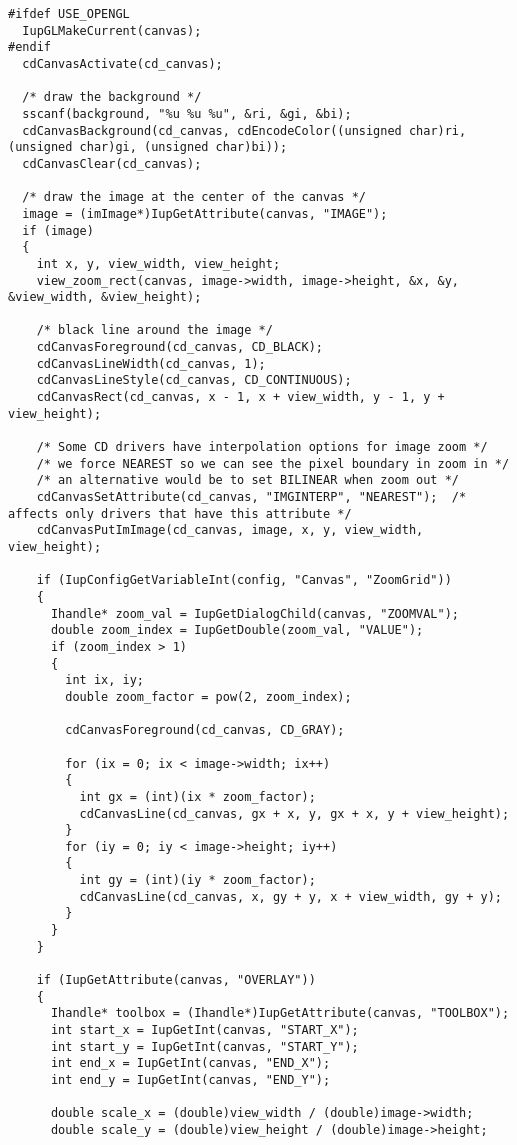 \documentclass{ctexart}
\begin{document}
\begin{lstlisting}
#ifdef USE_OPENGL
  IupGLMakeCurrent(canvas);
#endif
  cdCanvasActivate(cd_canvas);

  /* draw the background */
  sscanf(background, "%u %u %u", &ri, &gi, &bi);
  cdCanvasBackground(cd_canvas, cdEncodeColor((unsigned char)ri, (unsigned char)gi, (unsigned char)bi));
  cdCanvasClear(cd_canvas);

  /* draw the image at the center of the canvas */
  image = (imImage*)IupGetAttribute(canvas, "IMAGE");
  if (image)
  {
    int x, y, view_width, view_height;
    view_zoom_rect(canvas, image->width, image->height, &x, &y, &view_width, &view_height);

    /* black line around the image */
    cdCanvasForeground(cd_canvas, CD_BLACK);
    cdCanvasLineWidth(cd_canvas, 1);
    cdCanvasLineStyle(cd_canvas, CD_CONTINUOUS);
    cdCanvasRect(cd_canvas, x - 1, x + view_width, y - 1, y + view_height);

    /* Some CD drivers have interpolation options for image zoom */
    /* we force NEAREST so we can see the pixel boundary in zoom in */
    /* an alternative would be to set BILINEAR when zoom out */
    cdCanvasSetAttribute(cd_canvas, "IMGINTERP", "NEAREST");  /* affects only drivers that have this attribute */
    cdCanvasPutImImage(cd_canvas, image, x, y, view_width, view_height);

    if (IupConfigGetVariableInt(config, "Canvas", "ZoomGrid"))
    {
      Ihandle* zoom_val = IupGetDialogChild(canvas, "ZOOMVAL");
      double zoom_index = IupGetDouble(zoom_val, "VALUE");
      if (zoom_index > 1)
      {
        int ix, iy;
        double zoom_factor = pow(2, zoom_index);

        cdCanvasForeground(cd_canvas, CD_GRAY);

        for (ix = 0; ix < image->width; ix++)
        {
          int gx = (int)(ix * zoom_factor);
          cdCanvasLine(cd_canvas, gx + x, y, gx + x, y + view_height);
        }
        for (iy = 0; iy < image->height; iy++)
        {
          int gy = (int)(iy * zoom_factor);
          cdCanvasLine(cd_canvas, x, gy + y, x + view_width, gy + y);
        }
      }
    }

    if (IupGetAttribute(canvas, "OVERLAY"))
    {
      Ihandle* toolbox = (Ihandle*)IupGetAttribute(canvas, "TOOLBOX");
      int start_x = IupGetInt(canvas, "START_X");
      int start_y = IupGetInt(canvas, "START_Y");
      int end_x = IupGetInt(canvas, "END_X");
      int end_y = IupGetInt(canvas, "END_Y");

      double scale_x = (double)view_width / (double)image->width;
      double scale_y = (double)view_height / (double)image->height;


\end{lstlisting}
\end{document}
